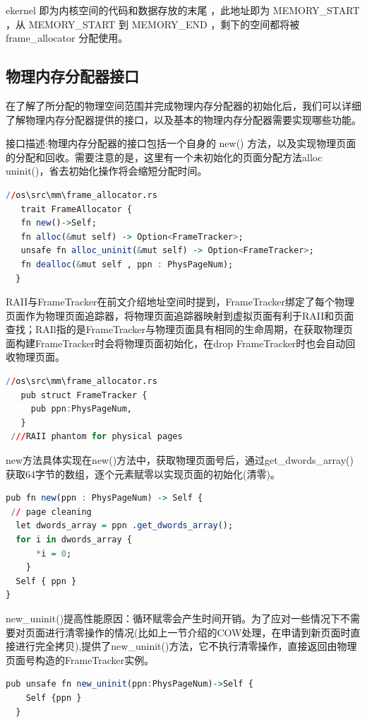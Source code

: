 	ekernel 即为内核空间的代码和数据存放的末尾 ，此地址即为 MEMORY\_START ，从 MEMORY\_START 到 MEMORY\_END ，剩下的空间都将被 frame\_allocator 分配使用。
	
	\subsection{物理内存分配器接口}
	在了解了所分配的物理空间范围并完成物理内存分配器的初始化后，我们可以详细了解物理内存分配器提供的接口，以及基本的物理内存分配器需要实现哪些功能。
	
	接口描述:物理内存分配器的接口包括一个自身的 new() 方法，以及实现物理页面的分配和回收。需要注意的是，这里有一个未初始化的页面分配方法alloc uninit()，省去初始化操作将会缩短分配时间。
\begin{lstlisting}[language=R]
 //os\src\mm\frame_allocator.rs
   trait FrameAllocator {
   fn new()->Self;
   fn alloc(&mut self) -> Option<FrameTracker>;
   unsafe fn alloc_uninit(&mut self) -> Option<FrameTracker>;
   fn dealloc(&mut self , ppn : PhysPageNum);
  }
\end{lstlisting}
    
    RAII与FrameTracker在前文介绍地址空间时提到，FrameTracker绑定了每个物理页面作为物理页面追踪器，将物理页面追踪器映射到虚拟页面有利于RAII和页面查找；RAIl指的是FrameTracker与物理页面具有相同的生命周期，在获取物理页面构建FrameTracker时会将物理页面初始化，在drop FrameTracker时也会自动回收物理页面。
    
    \begin{lstlisting}[language=R]
 //os\src\mm\frame_allocator.rs
   pub struct FrameTracker {
     pub ppn:PhysPageNum,
   }
 ///RAII phantom for physical pages
    \end{lstlisting}

    new方法具体实现在new()方法中，获取物理页面号后，通过get\_dwords\_array()获取64字节的数组，逐个元素赋零以实现页面的初始化(清零)。
\begin{lstlisting}[language=R]
 pub fn new(ppn : PhysPageNum) -> Self {
 // page cleaning
  let dwords_array = ppn .get_dwords_array();
  for i in dwords_array {
	  *i = 0;
	}
  Self { ppn }
}
\end{lstlisting}
    
    new\_uninit()提高性能原因：循环赋零会产生时间开销。为了应对一些情况下不需要对页面进行清零操作的情况(比如上一节介绍的COW处理，在申请到新页面时直接进行完全拷贝),提供了new\_uninit()方法，它不执行清零操作，直接返回由物理页面号构造的FrameTracker实例。
    \begin{lstlisting}[language=R]
 pub unsafe fn new_uninit(ppn:PhysPageNum)->Self {
    Self {ppn }
  }
    \end{lstlisting}

